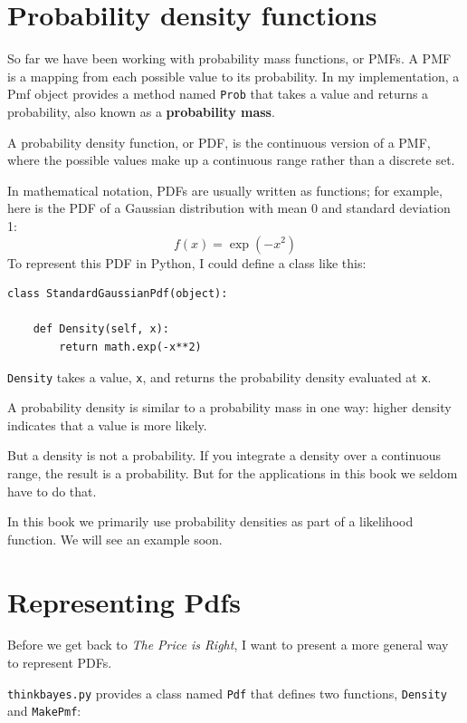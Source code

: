 \documentclass[12pt]{book}
\begin{document}
\section{Probability density functions}

So far we have been working with probability mass functions, or PMFs.
A PMF is a mapping from each possible value to its probability.  In my
implementation, a Pmf object provides a method named {\tt Prob} that
takes a value and returns a probability, also known as a {\bf probability
mass}.

A probability density function, or PDF, is the continuous version of a
PMF, where the possible values make up a continuous range rather than
a discrete set.  

In mathematical notation, PDFs are usually written as functions; for
example, here is the PDF of a Gaussian distribution with
mean 0 and standard deviation 1:
%
\[ f(x) = \exp(-x^2) \]
%
To represent this PDF in Python, I could define a class like this:

\begin{verbatim}
class StandardGaussianPdf(object):

    def Density(self, x):
        return math.exp(-x**2)
\end{verbatim}

{\tt Density} takes a value, {\tt x}, and returns the probability
density evaluated at {\tt x}.  

A probability density is similar
to a probability mass in one way: higher density indicates that a
value is more likely.

But a density is not a probability.  If you integrate a density
over a continuous range, the result is a probability.  But 
for the applications in this book we seldom have to do that.

In this book we primarily use probability densities as part
of a likelihood function.  We will see an example soon.


\section{Representing Pdfs}

Before we get back to {\it The Price is Right}, I want to
present a more general way to represent PDFs.

{\tt thinkbayes.py} provides a class named {\tt Pdf} that defines
two functions, {\tt Density} and {\tt MakePmf}:
\end{document}
